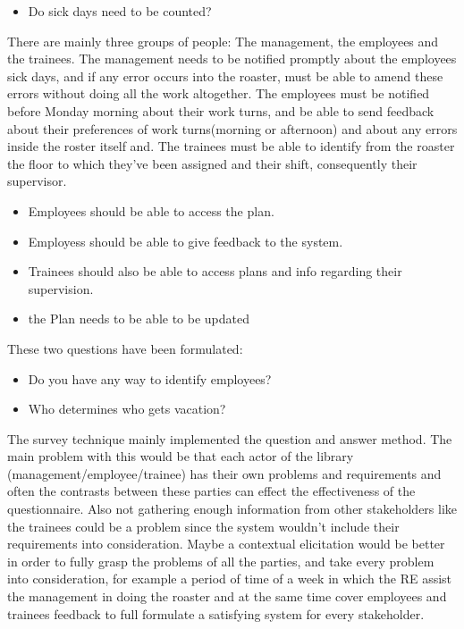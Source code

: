 \begin{elenco}
\begin{itemize}
		\item Do sick days need to be counted?
	\end{itemize}
	\item There are mainly three groups of people: The management, the employees and the trainees. The management needs to be notified promptly about the employees sick days, and if any error occurs into the roaster, must be able to amend these errors without doing all the work altogether. The employees must be notified before Monday morning about their work turns, and be able to send feedback about their preferences of work turns(morning or afternoon) and about any errors inside the roster itself and. The trainees must be able to identify from the roaster the floor to which they've been assigned and their shift, consequently their supervisor. 
	\begin{itemize}
		\item Employees should be able to access the plan.
		\item Employess should be able to give feedback to the system.
		\item Trainees should also be able to access plans and info regarding their supervision.
		\item the Plan needs to be able to be updated
	\end{itemize}
	\item These two questions have been formulated:
	\begin{itemize}
	\item Do you have any way to identify employees? 
	\item Who determines who gets vacation?
	\end{itemize}
	\item The survey technique mainly implemented the question and answer method. The main problem with this would be that each actor of the library (management/employee/trainee) has their own problems and requirements and often the contrasts between these parties can effect the effectiveness of the questionnaire. Also not gathering enough information from other stakeholders like the trainees could be a problem since the system wouldn't include their requirements into consideration. Maybe a contextual elicitation would be better in order to fully grasp the problems of all the parties, and take every problem into consideration, for example a period of time of a week in which the RE assist the management in doing the roaster and at the same time cover employees and trainees feedback to full formulate a satisfying system for every stakeholder.
\end{elenco}
